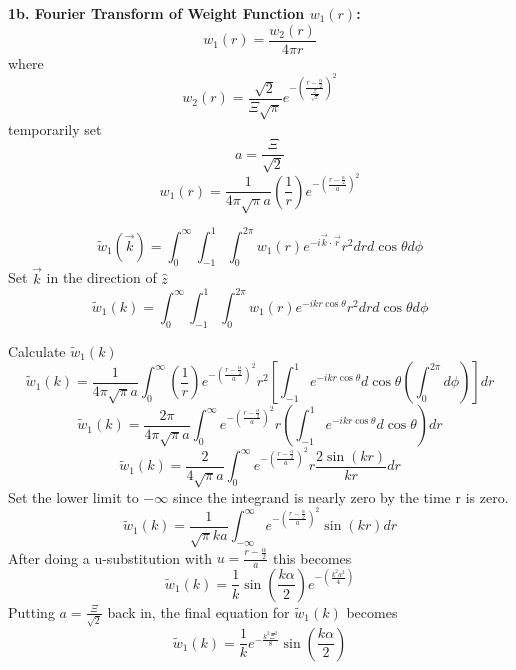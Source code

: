 \documentclass[12pt]{article}
\begin{document}
\[{}\]
\textbf{1b. Fourier Transform of Weight Function $w_{1}(r)$:}
\begin{equation}{w_1(r)=\frac{w_2(r)}{4{\pi}r}}\end{equation}
where
\begin{equation}{w_2(r)=\frac{\sqrt{2}}{\Xi\sqrt{\pi}}e^{-\left(\frac{r-\frac{\alpha}{2}}{\frac{\Xi}{\sqrt{2}}}\right)^2}}\end{equation}
temporarily set 
\begin{equation}{a=\frac{\Xi}{\sqrt{2}}}\end{equation}
\begin{equation}{w_1(r)=\frac{1}{4{\pi}\sqrt{\pi}a}\left(\frac{1}{r}\right)e^{-\left(\frac{r-\frac{\alpha}{2}}{a}\right)^2}}\end{equation}

\begin{equation}{\widetilde{w}_1(\vec{k})=\int_{0}^{\infty}\int_{-1}^{1}\int_{0}^{2\pi}w_1(r)e^{-i\vec{k}\cdot{\vec{r}}}r^2d{r}d{\cos\theta}d{\phi}}\end{equation}
Set $\vec{k}$ in the direction of $\hat{z}$ 
\begin{equation}{\widetilde{w}_1(k)=\int_{0}^{\infty}\int_{-1}^{1}\int_{0}^{2\pi}w_1(r)e^{-ikr\cos\theta}r^2d{r}d{\cos\theta}d{\phi}}\end{equation}

\noindent Calculate $\widetilde{w}_1(k)$ 
\begin{equation}{\widetilde{w}_1(k)=\frac{1}{4{\pi}\sqrt{\pi}a}\int_{0}^{\infty}\left(\frac{1}{r}\right)e^{-\left(\frac{r-\frac{\alpha}{2}}{a}\right)^2}r^2\left[\int_{-1}^{1}e^{-ikr\cos\theta}d{\cos\theta}\left(\int_{0}^{2\pi}d{\phi}\right)\right]d{r}}\end{equation}
\[{}\]
\begin{equation}{\widetilde{w}_1(k)=\frac{2\pi}{4{\pi}\sqrt{\pi}a}\int_{0}^{\infty}e^{-\left(\frac{r-\frac{\alpha}{2}}{a}\right)^2}r\left(\int_{-1}^{1}e^{-ikr\cos\theta}d{\cos\theta}\right)d{r}}\end{equation}
\[{}\]
\begin{equation}{\widetilde{w}_1(k)=\frac{2}{4\sqrt{\pi}a}\int_{0}^{\infty}e^{-\left(\frac{r-\frac{\alpha}{2}}{a}\right)^2}r\frac{2\sin(kr)}{kr}d{r}}\end{equation}
Set the lower limit to $-\infty$ since the integrand is nearly zero by the time r is zero. 
\begin{equation}{\widetilde{w}_1(k)=\frac{1}{\sqrt{\pi}ka}\int_{-\infty}^{\infty}e^{-\left(\frac{r-\frac{\alpha}{2}}{a}\right)^2}\sin(kr)d{r}}\end{equation}
After doing a u-substitution with $u=\frac{r-\frac{\alpha}{2}}{a}$ this becomes
\begin{equation}{\widetilde{w}_1(k)=\frac{1}{k}\sin\left(\frac{k\alpha}{2}\right)e^{-\left(\frac{k^2a^2}{4}\right)}}\end{equation}
Putting $a=\frac{\Xi}{\sqrt{2}}$ back in, the final equation for $\widetilde{w}_1(k)$ becomes
\begin{equation}
    \widetilde{w}_1(k)=\frac{1}{k}e^{-\frac{k^2\Xi^2}{8}}\sin\left(\frac{k\alpha}{2}\right)
\end{equation}
\end{document}
